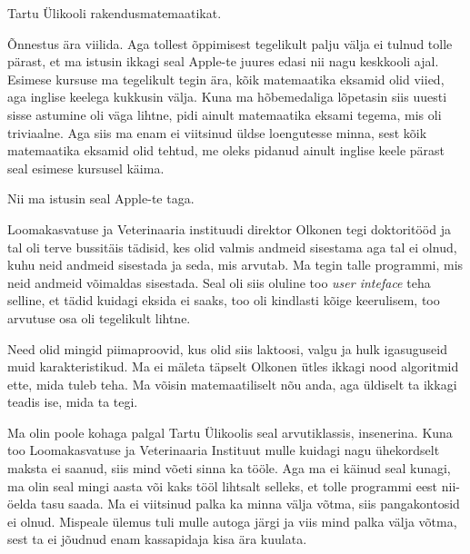 
Tartu Ülikooli rakendusmatemaatikat. 


Õnnestus ära viilida. Aga tollest õppimisest tegelikult palju välja ei tulnud tolle pärast, et ma istusin ikkagi seal Apple-te juures edasi nii nagu keskkooli ajal. Esimese kursuse ma tegelikult tegin ära, kõik matemaatika eksamid olid viied, aga inglise keelega kukkusin välja. Kuna ma hõbemedaliga lõpetasin  siis uuesti sisse astumine oli väga lihtne, pidi ainult matemaatika eksami tegema, mis oli triviaalne. Aga siis ma enam ei viitsinud üldse loengutesse minna, sest  kõik matemaatika eksamid olid tehtud, me oleks pidanud ainult inglise keele pärast seal esimese kursusel käima.

Nii ma istusin seal Apple-te taga. 

Loomakasvatuse ja Veterinaaria instituudi direktor Olkonen tegi doktoritööd ja tal oli terve bussitäis tädisid, kes olid valmis andmeid sisestama aga tal ei olnud, kuhu neid andmeid sisestada ja seda, mis arvutab. Ma tegin talle  programmi, mis neid andmeid võimaldas sisestada. Seal oli siis oluline too \emph{user inteface} teha selline, et tädid kuidagi eksida ei saaks, too oli kindlasti kõige keerulisem, too arvutuse osa oli  tegelikult lihtne.


Need olid mingid piimaproovid, kus olid siis laktoosi, valgu ja hulk igasuguseid muid karakteristikud.  Ma ei mäleta täpselt Olkonen ütles ikkagi nood algoritmid ette, mida tuleb teha. Ma võisin matemaatiliselt nõu anda, aga  üldiselt ta ikkagi teadis ise, mida ta tegi. 


Ma olin poole kohaga palgal Tartu Ülikoolis seal arvutiklassis,  insenerina. Kuna too Loomakasvatuse ja Veterinaaria Instituut mulle kuidagi nagu ühekordselt maksta ei saanud, siis mind võeti sinna ka tööle. Aga ma ei käinud seal kunagi, ma olin seal mingi aasta või kaks tööl lihtsalt selleks, et tolle programmi eest nii-öelda tasu saada. Ma ei viitsinud palka ka minna välja võtma,  siis pangakontosid ei olnud. Mispeale ülemus tuli mulle autoga järgi ja viis mind palka välja võtma, sest ta ei jõudnud enam  kassapidaja kisa ära kuulata.


